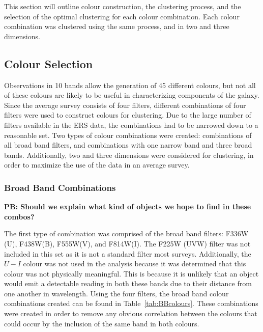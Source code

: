 This section will outline colour construction, the clustering process, and the selection of the optimal clustering for each colour combination.
Each colour combination was clustered using the same process, and in two and three dimensions.

\subsection{Colour Selection}

Observations in 10 bands allow the generation of 45 different colours, but not all of these colours are likely to be useful in characterizing components of the galaxy.
Since the average survey consists of four filters, different combinations of four filters were used to construct colours for clustering. 
Due to the large number of filters available in the ERS data, the combinations had to be narrowed down to a reasonable set.
Two types of colour combinations were created: combinations of all broad band filters, and combinations with one narrow band and three broad bands.
Additionally, two and three dimensions were considered for clustering, in order to maximize the use of the data in an average survey.

\subsubsection{Broad Band Combinations}

\textbf{PB: Should we explain what kind of objects we hope to find in these combos?}

The first type of combination was comprised of the broad band filters: F336W (U), F438W(B), F555W(V), and F814W(I).
The F225W (UVW) filter was not included in this set as it is not a standard filter most surveys.
Additionally, the $U - I$ colour was not used in the analysis because it was determined that this colour was not physically meaningful.
This is because it is unlikely that an object would emit a detectable reading in both these bands due to their distance from one another in wavelength.
Using the four filters, the broad band colour combinations created can be found in Table~\ref{tab:BBcolours}.
These combinations were created in order to remove any obvious correlation between the colours that could occur by the inclusion of the same band in both colours.

